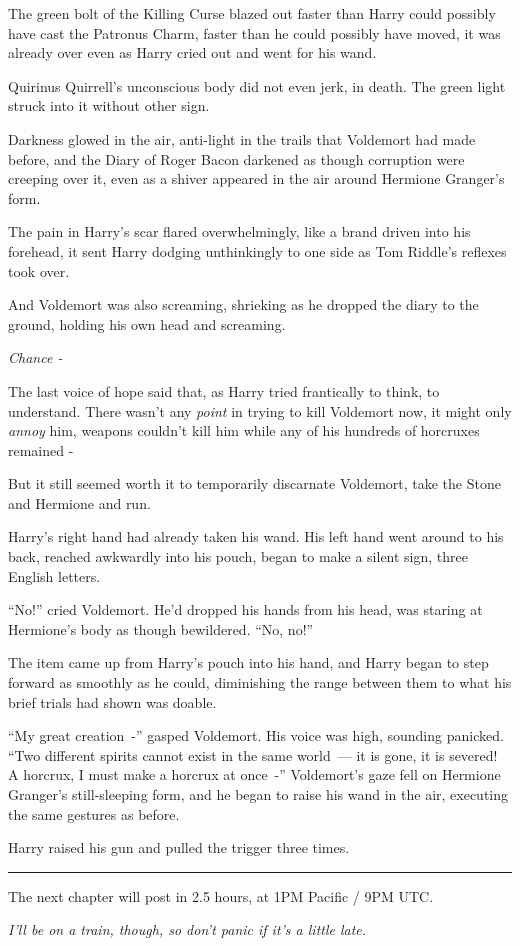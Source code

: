 The green bolt of the Killing Curse blazed out faster than Harry could possibly have cast the Patronus Charm, faster than he could possibly have moved, it was already over even as Harry cried out and went for his wand.

Quirinus Quirrell's unconscious body did not even jerk, in death. The green light struck into it without other sign.

Darkness glowed in the air, anti-light in the trails that Voldemort had made before, and the Diary of Roger Bacon darkened as though corruption were creeping over it, even as a shiver appeared in the air around Hermione Granger's form.

The pain in Harry's scar flared overwhelmingly, like a brand driven into his forehead, it sent Harry dodging unthinkingly to one side as Tom Riddle's reflexes took over.

And Voldemort was also screaming, shrieking as he dropped the diary to the ground, holding his own head and screaming.

\emph{Chance -}

The last voice of hope said that, as Harry tried frantically to think, to understand. There wasn't any \emph{point} in trying to kill Voldemort now, it might only \emph{annoy} him, weapons couldn't kill him while any of his hundreds of horcruxes remained -

But it still seemed worth it to temporarily discarnate Voldemort, take the Stone and Hermione and run.

Harry's right hand had already taken his wand. His left hand went around to his back, reached awkwardly into his pouch, began to make a silent sign, three English letters.

``No!'' cried Voldemort. He'd dropped his hands from his head, was staring at Hermione's body as though bewildered. ``No, no!''

The item came up from Harry's pouch into his hand, and Harry began to step forward as smoothly as he could, diminishing the range between them to what his brief trials had shown was doable.

``My great creation~-'' gasped Voldemort. His voice was high, sounding panicked. ``Two different spirits cannot exist in the same world~--- it is gone, it is severed! A horcrux, I must make a horcrux at once~-'' Voldemort's gaze fell on Hermione Granger's still-sleeping form, and he began to raise his wand in the air, executing the same gestures as before.

Harry raised his gun and pulled the trigger three times.

\begin{center}\rule{3in}{0.4pt}\end{center}

The next chapter will post in 2.5 hours, at 1PM Pacific / 9PM UTC.

\emph{I'll be on a train, though, so don't panic if it's a little late.}
